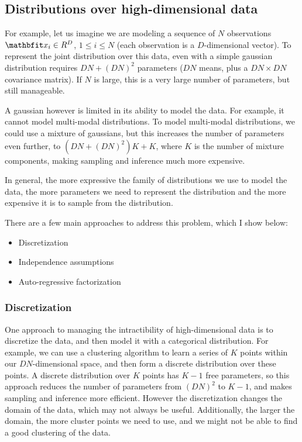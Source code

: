 \subsection{Distributions over high-dimensional data}

For example, let us imagine we are modeling a sequence of $N$ observations $\x_i \in \R^D$, $1 ≤ i ≤ N$ (each observation is a $D$-dimensional vector). To represent the joint distribution over this data, even with a simple gaussian distribution requires $DN + (DN)^2$ parameters ($DN$ means, plus a $DN \times DN$ covariance matrix). If $N$ is large, this is a very large number of parameters, but still manageable.

A gaussian however is limited in its ability to model the data. For example, it cannot model multi-modal distributions. To model multi-modal distributions, we could use a mixture of gaussians, but this increases the number of parameters even further, to $(DN + (DN)^2)K + K$, where $K$ is the number of mixture components, making sampling and inference much more expensive.

In general, the more expressive the family of distributions we use to model the data, the more parameters we need to represent the distribution and the more expensive it is to sample from the distribution.

There are a few main approaches to address this problem, which I show below:

\begin{itemize}
    \item Discretization
    \item Independence assumptions
    \item Auto-regressive factorization
\end{itemize}

\subsubsection{Discretization}

One approach to managing the intractibility of high-dimensional data is to discretize the data, and then model it with a categorical distribution. For example, we can use a clustering algorithm to learn a series of $K$ points within our $DN$-dimensional space, and then form a discrete distribution over these points. A discrete distribution over $K$ points has $K-1$ free parameters, so this approach reduces the number of parameters from $(DN)^2$ to $K-1$, and makes sampling and inference more efficient. However the discretization changes the domain of the data, which may not always be useful. Additionally, the larger the domain, the more cluster points we need to use, and we might not be able to find a good clustering of the data.


